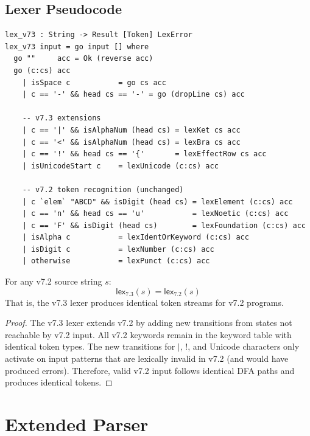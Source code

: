 \subsection{Lexer Pseudocode}
\label{subsec:lexer-pseudocode}

\begin{definition}
\label{def:lexer-algorithm}
\begin{verbatim}
lex_v73 : String -> Result [Token] LexError
lex_v73 input = go input [] where
  go ""     acc = Ok (reverse acc)
  go (c:cs) acc
    | isSpace c           = go cs acc
    | c == '-' && head cs == '-' = go (dropLine cs) acc

    -- v7.3 extensions
    | c == '|' && isAlphaNum (head cs) = lexKet cs acc
    | c == '<' && isAlphaNum (head cs) = lexBra cs acc
    | c == '!' && head cs == '{'       = lexEffectRow cs acc
    | isUnicodeStart c    = lexUnicode (c:cs) acc

    -- v7.2 token recognition (unchanged)
    | c `elem` "ABCD" && isDigit (head cs) = lexElement (c:cs) acc
    | c == 'n' && head cs == 'u'           = lexNoetic (c:cs) acc
    | c == 'F' && isDigit (head cs)        = lexFoundation (c:cs) acc
    | isAlpha c           = lexIdentOrKeyword (c:cs) acc
    | isDigit c           = lexNumber (c:cs) acc
    | otherwise           = lexPunct (c:cs) acc
\end{verbatim}
\end{definition}

\begin{proposition}
\label{prop:lex-backwards-compat}
For any v7.2 source string $s$:
\[
\mathsf{lex}_{7.3}(s) = \mathsf{lex}_{7.2}(s)
\]
That is, the v7.3 lexer produces identical token streams for v7.2 programs.
\end{proposition}

\begin{proof}
The v7.3 lexer extends v7.2 by adding new transitions from states not reachable by v7.2 input. All v7.2 keywords remain in the keyword table with identical token types. The new transitions for $|$, $!$, and Unicode characters only activate on input patterns that are lexically invalid in v7.2 (and would have produced errors). Therefore, valid v7.2 input follows identical DFA paths and produces identical tokens.
\end{proof}

\section{Extended Parser}
\label{sec:extended-parser}

